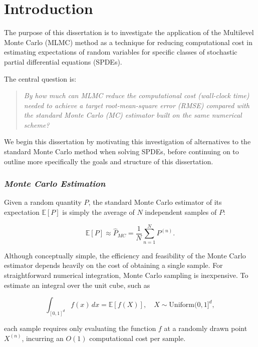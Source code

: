 \section{Introduction}\label{sec:introduction}

The purpose of this dissertation is to investigate the application of 
the Multilevel Monte Carlo (MLMC) method as a technique for 
reducing computational cost in estimating expectations 
of random variables for specific classes of 
stochastic partial differential equations (SPDEs).  

The central question 
is:
\begin{quote}
\emph{By how much can MLMC reduce the computational cost (wall-clock time)
needed to achieve a target root-mean-square error (RMSE) compared with the
standard Monte Carlo (MC) estimator built on the same numerical scheme?}
\end{quote}


We begin this dissertation by motivating this investigation of 
alternatives to the standard Monte Carlo method when solving SPDEs, 
before continuing on to outline more specifically the goals and structure
of this dissertation.

\subsubsection*{\textit{Monte Carlo Estimation}}

Given a random quantity $P$, the standard Monte Carlo estimator of its 
expectation $\mathbb{E}[P]$ is simply the average of $N$ independent 
samples of $P$:

\begin{equation*}
    \mathbb{E}[P] \approx \hat{P}_{MC} = \frac{1}{N} \sum_{n=1}^N P^{(n)}.
\end{equation*}

Although conceptually simple, the efficiency and feasibility of the Monte Carlo 
estimator depends heavily on the cost of obtaining a single sample. For straightforward
numerical integration, Monte Carlo sampling is inexpensive. To estimate 
an integral over the unit cube, such as 

\begin{equation*}
    \int_{[0,1]^d} f(x)\,dx = \mathbb{E}[f(X)], \quad X\sim\text{Uniform}(0,1]^d,
\end{equation*}

each sample requires only evaluating the function $f$ at a randomly drawn point $X^{(n)}$,
incurring an $O(1)$ computational cost per sample.

